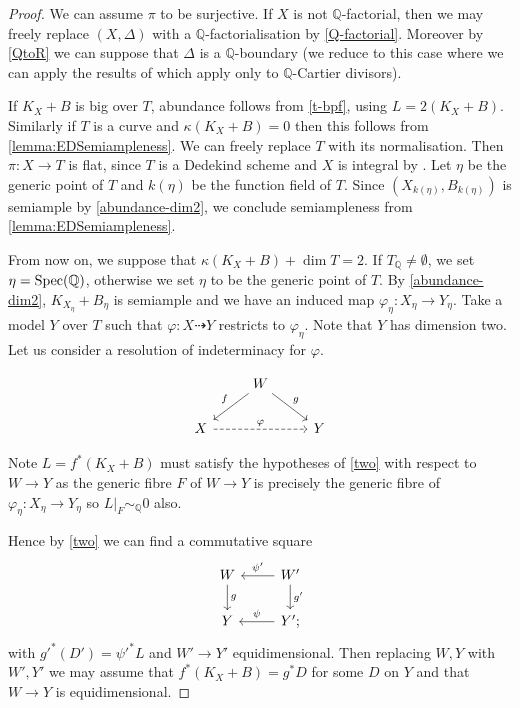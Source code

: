 	\begin{proof}
		We can assume $\pi$ to be surjective.
		If $X$ is not $\mathbb{Q}$-factorial, then we may freely replace $(X,\Delta)$ with a $\mathbb{Q}$-factorialisation by \autoref{Q-factorial}. Moreover by \autoref{QtoR} we can suppose that $\Delta$ is a $\mathbb{Q}$-boundary (we reduce to this case where we can apply the results of \cite{witaszek2020keels} which apply only to $\mathbb{Q}$-Cartier divisors).
		
		If $K_{X}+B$ is big over $T$, abundance follows from \autoref{t-bpf}, using $L=2(K_{X}+B)$. Similarly if $T$ is a curve and $\kappa(K_{X}+B)=0$ then this follows from \autoref{lemma:EDSemiampleness}. We can freely replace $T$ with its normalisation. Then $\pi \colon X \to T$ is flat, since $T$ is a Dedekind scheme and $X$ is integral by \cite[Proposition 9.7]{Ha77}. Let $\eta$ be the generic point of $T$ and $k(\eta)$ be the function field of $T$. Since $(X_{k(\eta)}, B_{k(\eta)})$ is semiample by \autoref{abundance-dim2}, we conclude semiampleness from \autoref{lemma:EDSemiampleness}. 
		
		From now on, we suppose that $\kappa(K_{X}+B)+\dim T=2$.
		If $T_\mathbb{Q} \neq \emptyset$, we set $\eta=\operatorname{Spec}(\mathbb{Q})$, otherwise we set $\eta$ to be the generic point of $T$. 
		By \autoref{abundance-dim2},  $K_{X_\eta}+B_\eta$ is semiample and we have an induced map $\varphi_{\eta} \colon X_{\eta} \to Y_{\eta}$.
		Take a model $Y$ over $T$ such that $\varphi \colon X \dashrightarrow Y$ restricts to $\varphi_{\eta}$. Note that $Y$ has dimension two. Let us consider a resolution of indeterminacy for $\varphi$.
		
		\[\begin{tikzcd}
		& W \arrow[ld, "f"'] \arrow[rd, "g"] &   \\
		X \arrow[rr, "\varphi", dashed] &                                   & Y
		\end{tikzcd}\]
		
		Note $L=f^{*}(K_{X}+B)$ must satisfy the hypotheses of \autoref{two} with respect to $W \to Y$ as the generic fibre $F$ of $W \to Y$ is precisely the generic fibre of $\varphi_{\eta} \colon X_{\eta} \to Y_{\eta}$ so $L|_{F}\sim_{\mathbb{Q}} 0$ also. 
		
		Hence by \autoref{two} we can find a commutative square
		\[\begin{tikzcd}
		W \arrow[d, "g"]  & W' \arrow[d, "g'"] \arrow[l, "\psi'"'] \\
		Y               & Y' ;   \arrow[l, "\psi"']               
		\end{tikzcd}\] 
		with $g'^{*}(D')=\psi'^{*}L$ and $W' \to Y'$ equidimensional. Then replacing $W,Y$ with $W',Y'$ we may assume that $f^{*}(K_{X}+B)=g^{*}D$ for some $D$ on $Y$ and that $W \to Y$ is equidimensional.
		

\end{proof}
